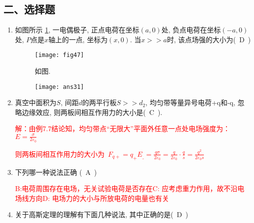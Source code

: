 \subsection*{二、选择题}
\begin{enumerate}
    \item 如图所示 \ref{Fig:47}, 一电偶极子, 正点电荷在坐标$(a,0)$处, 负点电荷在坐标$(-a,0)$处, $P$点是$x$轴上的一点, 坐标为$(x,0)$. 当$x>>a$时, 该点场强的大小为(~D~)
    \begin{figure}[H]
        \centering
        \texttt{[image: fig47]}
        \caption{如图.}\label{Fig:47}
    \end{figure}
    \begin{note}
        \begin{figure}[H]
        \centering
        \texttt{[image: ans31]} 
    \end{figure}
    \end{note}
    \item 真空中面积为$S$, 间距$d$的两平行板$S>>d_2$, 均匀带等量异号电荷+q和-q, 忽略边缘效应, 则两板间相互作用力的大小是(~C~).
    \begin{note}
        \textcolor{red}{解：由例7.7结论知，均匀带点“无限大”平面外任意一点处电场强度为：$E=\frac{\sigma}{2\varepsilon_0}$}\par
        \textcolor{red}{则两板间相互作用力的大小为~$F_{q+}=q_+E_\_=\frac{q\sigma}{2\varepsilon_0}=\frac{q}{2\varepsilon_0}\cdot\frac{q}{s}=\frac{q^2}{2\varepsilon_0 s}$        }
    \end{note}
    \item  下列哪一种说法正确 (~A~)
    \begin{note}
        \textcolor{red}{B:电荷周围存在电场，无关试验电荷是否存在\quad C:  应考虑重力作用，故不沿电场线方向\quad D:  电场力的大小与所放电荷的电量也有关
        }
    \end{note}
    \item 关于高斯定理的理解有下面几种说法, 其中正确的是(~D~)

\end{enumerate}
